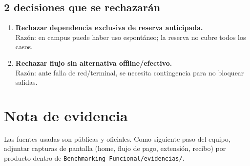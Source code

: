 \documentclass[11pt]{article}
\begin{document}
\subsection*{2 decisiones que se rechazarán}
\begin{enumerate}
\item \textbf{Rechazar dependencia exclusiva de reserva anticipada.}\\
Razón: en campus puede haber uso espontáneo; la reserva no cubre todos los casos.
\item \textbf{Rechazar flujo sin alternativa offline/efectivo.}\\
Razón: ante falla de red/terminal, se necesita contingencia para no bloquear salidas.
\end{enumerate}

\section*{Nota de evidencia}
Las fuentes usadas son públicas y oficiales. Como siguiente paso del equipo, adjuntar capturas de pantalla (home, flujo de pago, extensión, recibo) por producto dentro de \texttt{Benchmarking Funcional/evidencias/}.
\end{document}
